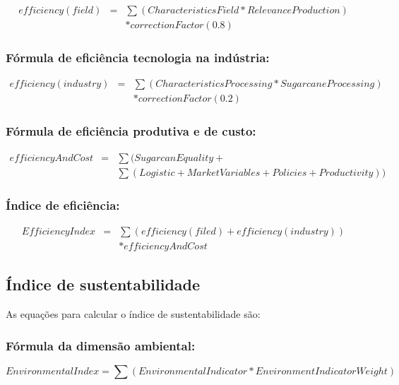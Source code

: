 \begin{eqnarray*}
efficiency(field) & = & \sum(CharacteristicsField*RelevanceProduction)\\
 &  & *correctionFactor(0.8)
\end{eqnarray*}


\subsubsection*{Fórmula de eficiência tecnologia na indústria:}

\begin{eqnarray*}
efficiency(industry) & = & \sum(CharacteristicsProcessing*SugarcaneProcessing)\\
 &  & *correctionFactor(0.2)
\end{eqnarray*}


\subsubsection*{Fórmula de eficiência produtiva e de custo:}

\begin{eqnarray*}
efficiencyAndCost & = & \sum(SugarcanEquality+\\
 &  & \sum(Logistic+MarketVariables+Policies+Productivity))
\end{eqnarray*}


\subsubsection*{Índice de eficiência:}

\begin{eqnarray*}
EfficiencyIndex & = & \sum(efficiency(filed)+efficiency(industry))\\
 &  & *efficiencyAndCost
\end{eqnarray*}


\subsection*{Índice de sustentabilidade}

As equações para calcular o índice de sustentabilidade são:

\subsubsection*{Fórmula da dimensão ambiental:}

\[
EnvironmentalIndex=\sum(EnvironmentalIndicator*EnvironmentIndicatorWeight)
\]


